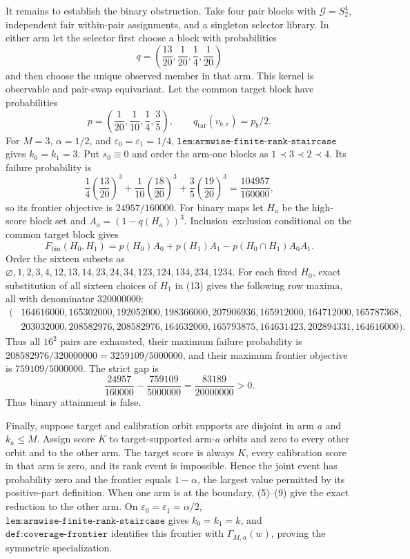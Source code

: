 It remains to establish the binary obstruction. Take four pair blocks with \(\mathcal G=S_2^4\), independent fair within-pair assignments, and a singleton selector library. In either arm let the selector first choose a block with probabilities
\[
q=\left(\frac{13}{20},\frac1{20},\frac14,\frac1{20}\right)
\tag{10}
\]
and then choose the unique observed member in that arm. This kernel is observable and pair-swap equivariant. Let the common target block have probabilities
\[
p=\left(\frac1{20},\frac1{10},\frac14,\frac35\right),\qquad q_{\mathrm{tar}}(v_{b,r})=p_b/2.
\tag{11}
\]
For \(M=3\), \(\alpha=1/2\), and \(\varepsilon_0=\varepsilon_1=1/4\), \(\texttt{lem:armwise-finite-rank-staircase}\) gives \(k_0=k_1=3\). Put \(s_0\equiv0\) and order the arm-one blocks as \(1\prec 3\prec 2\prec 4\). Its failure probability is
\[
\frac14\left(\frac{13}{20}\right)^3+\frac1{10}\left(\frac{18}{20}\right)^3+\frac35\left(\frac{19}{20}\right)^3=\frac{104957}{160000},
\tag{12}
\]
so its frontier objective is \(24957/160000\). For binary maps let \(H_a\) be the high-score block set and \(A_a=(1-q(H_a))^3\). Inclusion--exclusion conditional on the common target block gives
\[
F_{\mathrm{bin}}(H_0,H_1)=p(H_0)A_0+p(H_1)A_1-p(H_0\cap H_1)A_0A_1.
\tag{13}
\]
Order the sixteen subsets as \(\varnothing,1,2,3,4,12,13,14,23,24,34,123,124,134,234,1234\). For each fixed \(H_0\), exact substitution of all sixteen choices of \(H_1\) in (13) gives the following row maxima, all with denominator \(320000000\):
\[
\begin{split}
(&164616000,165302000,192052000,198366000,207906936,165912000,164712000,165787368,\\
&203032000,208582976,208582976,164632000,165793875,164631423,202894331,164616000).
\end{split}
\tag{14}
\]
Thus all \(16^2\) pairs are exhausted, their maximum failure probability is \(208582976/320000000=3259109/5000000\), and their maximum frontier objective is \(759109/5000000\). The strict gap is
\[
\frac{24957}{160000}-\frac{759109}{5000000}=\frac{83189}{20000000}>0.
\tag{15}
\]
Thus binary attainment is false.

Finally, suppose target and calibration orbit supports are disjoint in arm \(a\) and \(k_a\le M\). Assign score \(K\) to target-supported arm-\(a\) orbits and zero to every other orbit and to the other arm. The target score is always \(K\), every calibration score in that arm is zero, and its rank event is impossible. Hence the joint event has probability zero and the frontier equals \(1-\alpha\), the largest value permitted by its positive-part definition. When one arm is at the boundary, (5)--(9) give the exact reduction to the other arm. On \(\varepsilon_0=\varepsilon_1=\alpha/2\), \(\texttt{lem:armwise-finite-rank-staircase}\) gives \(k_0=k_1=k\), and \(\texttt{def:coverage-frontier}\) identifies this frontier with \(\Gamma_{M,\alpha}(w)\), proving the symmetric specialization.
